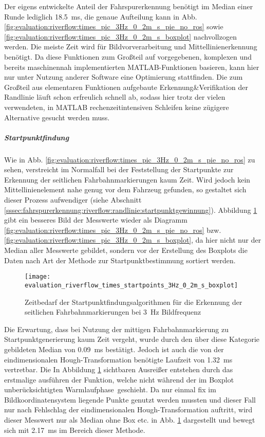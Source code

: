 Der eigens entwickelte Anteil der Fahrspurerkennung benötigt im Median einer Runde lediglich \SI{18,5}{ms}, die genaue Aufteilung kann in Abb. \ref{fig:evaluation:riverflow:times_pic_3Hz_0_2m_s_pie_no_ros} sowie \ref{fig:evaluation:riverflow:times_pic_3Hz_0_2m_s_boxplot} nachvollzogen werden. Die meiste Zeit wird für Bildvorverarbeitung und Mittellinienerkennung benötigt. Da diese Funktionen zum Großteil auf vorgegebenen, komplexen und bereits maschinennah implementierten MATLAB-Funktionen basieren, kann hier nur unter Nutzung anderer Software eine Optimierung stattfinden. Die zum Großteil aus elementaren Funktionen aufgebaute Erkennung\&Verifikation der Randlinie läuft schon erfreulich schnell ab, sodass hier trotz der vielen verwendeten, in MATLAB rechenzeitintensiven Schleifen keine zügigere Alternative gesucht werden muss.

\subparagraph{Startpunktfindung}
Wie in Abb. \ref{fig:evaluation:riverflow:times_pic_3Hz_0_2m_s_pie_no_ros} zu sehen, verstreicht im Normalfall bei der Feststellung der Startpunkte zur Erkennung der seitlichen Fahrbahnmarkierungen kaum Zeit. Wird jedoch kein Mittellinienelement nahe genug vor dem Fahrzeug gefunden, so gestaltet sich dieser Prozess aufwendiger (siehe Abschnitt \ref{sssec:fahrspurerkennung:riverflow:randlinie:startpunktgewinnung}). Abbildung \ref{fig:evaluation:riverflow:times_startpoints_3Hz_0_2m_s_boxplot} gibt ein besseres Bild der Messwerte wieder als Diagramm \ref{fig:evaluation:riverflow:times_pic_3Hz_0_2m_s_pie_no_ros} bzw. \ref{fig:evaluation:riverflow:times_pic_3Hz_0_2m_s_boxplot}, da hier nicht nur der Median aller Messwerte gebildet, sondern vor der Erstellung des Boxplots die Daten nach Art der Methode zur Startpunktbestimmung sortiert werden. 
\begin{figure}[ht] %
	\centering
	\texttt{[image: evaluation\_riverflow\_times\_startpoints\_3Hz\_0\_2m\_s\_boxplot]}
	\label{fig:evaluation:riverflow:times_startpoints_3Hz_0_2m_s_boxplot}
	\caption{Zeitbedarf der Startpunktfindungsalgorithmen für die Erkennung der seitlichen Fahrbahnmarkierungen bei \SI{3}{\hertz} Bildfrequenz}
\end{figure}
Die Erwartung, dass bei Nutzung der mittigen Fahrbahnmarkierung zu Startpunktgenerierung kaum Zeit vergeht, wurde durch den über diese Kategorie gebildeten Median von \SI{0,09}{ms} bestätigt. Jedoch ist auch die von der eindimensionalen Hough-Transformation benötigte Laufzeit von \SI{1,32}{ms} vertretbar. Die In Abbildung \ref{fig:evaluation:riverflow:times_startpoints_3Hz_0_2m_s_boxplot} sichtbaren Ausreißer entstehen durch das erstmalige ausführen der Funktion, welche nicht während der im Boxplot unberücksichtigten \glqq Warmlaufphase\grqq\ geschieht. Da nur einmal fix im Bildkoordinatensystem liegende Punkte genutzt werden mussten und dieser Fall nur nach Fehlschlag der eindimensionalen Hough-Transformation auftritt, wird dieser Messwert nur als Median ohne Box etc. in Abb. \ref{fig:evaluation:riverflow:times_startpoints_3Hz_0_2m_s_boxplot} dargestellt und bewegt sich mit \SI{2,17}{ms} im Bereich dieser Methode.

